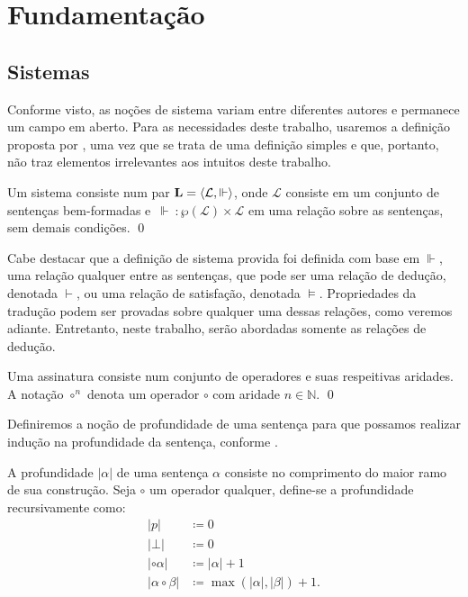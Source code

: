 \chapter{Fundamentação}

\section{Sistemas}

Conforme visto, as noções de sistema variam entre diferentes autores e permanece um campo em aberto. Para as necessidades deste trabalho, usaremos a definição proposta por \cite{Beziau}, uma vez que se trata de uma definição simples e que, portanto, não traz elementos irrelevantes aos intuitos deste trabalho.

\begin{definition}[Sistema]
    Um sistema consiste num par $\mathbf{L} = \langle\mathcal{L}, \Vdash\rangle$, onde $\mathcal{L}$ consiste em um conjunto de sentenças bem-formadas e $\, \Vdash \: : \wp(\mathcal{L}) \times \mathcal{L} $ em uma relação sobre as sentenças, sem demais condições.
    \qed
\end{definition}

Cabe destacar que a definição de sistema provida foi definida com base em $\Vdash$, uma relação qualquer entre as sentenças, que pode ser uma relação de dedução, denotada $\vdash$, ou uma relação de satisfação, denotada $\vDash$. Propriedades da tradução podem ser provadas sobre qualquer uma dessas relações, como veremos adiante. Entretanto, neste trabalho, serão abordadas somente as relações de dedução.

\begin{definition}[Assinatura]
    Uma assinatura consiste num conjunto de operadores e suas respeitivas aridades. A notação $\circ^n$ denota um operador $\circ$ com aridade $n \in \mathbb{N}$.
    \qed
\end{definition}

Definiremos a noção de profundidade de uma sentença para que possamos realizar indução na profundidade da sentença, conforme \cite{Troelstra}.

\begin{definition}[Profundidade]
    A profundidade $|\alpha|$ de uma sentença $\alpha$ consiste no comprimento do maior ramo de sua construção. Seja $\circ$ um operador qualquer, define-se a profundidade recursivamente como:
    \begin{align*}
        |p|                  & \coloneqq 0                           \\
        |\bot|               & \coloneqq 0                           \\
        |\circ \alpha|       & \coloneqq |\alpha| + 1                \\
        |\alpha \circ \beta| & \coloneqq \max(|\alpha|, |\beta|) + 1.
        \tag*{\qed} 
    \end{align*}
\end{definition}

